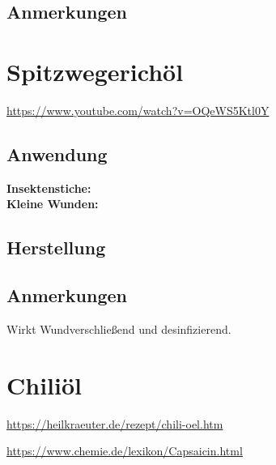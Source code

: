 \subsection{Anmerkungen}



\newpage




\section{Spitzwegerichöl}


\cite{swrhandwerkskunst} 

\url{https://www.youtube.com/watch?v=OQeWS5Ktl0Y}

 

\subsection{Anwendung}
\textbf{Insektenstiche:} \\ 

\textbf{Kleine Wunden:} \\

\subsection{Herstellung}
\subsection{Anmerkungen}

Wirkt Wundverschließend und desinfizierend.




\newpage



\section{Chiliöl}



\url{https://heilkraeuter.de/rezept/chili-oel.htm}

\url{https://www.chemie.de/lexikon/Capsaicin.html}

                

